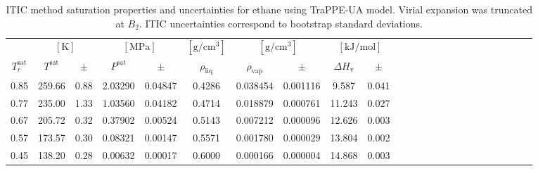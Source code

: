 \documentclass[%
 aip,
 jcp,
 sd,%
 amsmath,amssymb,
 reprint,%
]{revtex4-1}
\begin{document}
\begin{table}[]
\centering
\caption{ITIC method saturation properties and uncertainties for ethane using TraPPE-UA model. Virial expansion was truncated at $B_2$. ITIC uncertainties correspond to bootstrap standard deviations.}
\label{tab:EXAMPLE-SIM/TraPPE-C2}
\begin{ruledtabular}
\begin{tabular}{cccccccccccccccccccccccc}
 & \multicolumn{2}{c}{$[\mathrm{K}]$} &	 \multicolumn{2}{c}{$[\mathrm{MPa}]$} & $[\mathrm{g/cm^3}]$ & \multicolumn{2}{c}{$[\mathrm{g/cm^3}]$} & \multicolumn{2}{c}{$[\mathrm{kJ/mol}]$} \\
$T_r^{\mathrm{sat}}$ & $T^{\mathrm{sat}}$ & $\pm$ & $P^{\mathrm{sat}}$ & $\pm$ & $\rho_{\mathrm{liq}}$ & $\rho_{\mathrm{vap}}$ & $\pm$ & $\Delta H_{\mathrm{v}}$ & $\pm$
 \\
\hline		
0.85	&	259.66	&	0.88	&	2.03290	&	0.04847		&	0.4286	&	0.038454	&	0.001116	&	9.587	&	0.041	\\
0.77	&	235.00	&	1.33	&	1.03560	&	0.04182		&	0.4714	&	0.018879	&	0.000761	&	11.243	&	0.027	\\
0.67	&	205.72	&	0.32	&	0.37902	&	0.00524		&	0.5143	&	0.007212	&	0.000096	&	12.626	&	0.003	\\
0.57	&	173.57	&	0.30	&	0.08321	&	0.00147		&	0.5571	&	0.001780	&	0.000029	&	13.804	&	0.002	\\
0.45	&	138.20	&	0.28	&	0.00632	&	0.00017		&	0.6000	&	0.000166	&	0.000004	&	14.868	&	0.003	\\
\end{tabular}
\end{ruledtabular}
\end{table}
\end{document}
